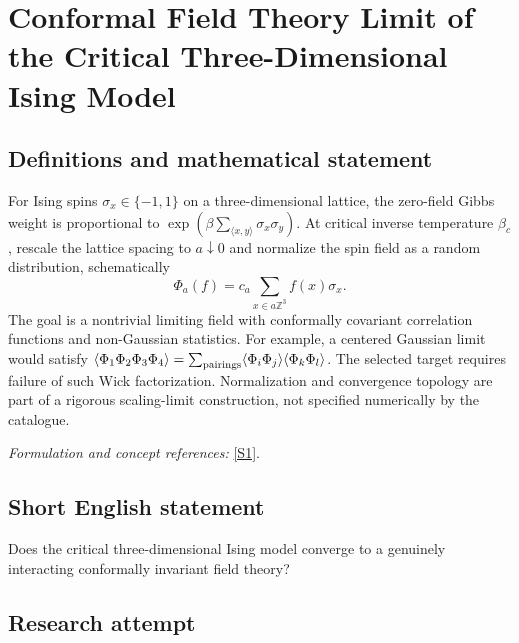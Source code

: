 \documentclass[11pt,a4paper]{article}
\newcommand{\Z}{\mathbb{Z}}
\newcommand{\sref}[2]{\hyperlink{source:#1:#2}{[S#2]}}
\newif\ifshowcatalogue
\newcommand{\cataloguescope}[1]{\ifshowcatalogue
 \paragraph{Exact scope in the supplied catalogue.}
 \begin{quote}\small #1\end{quote}\fi}
\numberwithin{equation}{section}
\begin{document}
\setcounter{section}{0}
\clearpage
\section*{\texorpdfstring{Conformal Field Theory Limit of the Critical Three-Dimensional Ising Model}{Conformal Field Theory Limit of the Critical Three-Dimensional Ising Model}}\label{30006692}
\subsection{Definitions and mathematical statement}
For Ising spins $\sigma_x\in\{-1,1\}$ on a three-dimensional lattice, the zero-field Gibbs weight is proportional to $\exp(\beta\sum_{\langle x,y\rangle}\sigma_x\sigma_y)$. At critical inverse temperature $\beta_c$, rescale the lattice spacing to $a\downarrow0$ and normalize the spin field as a random distribution, schematically
\[
 \Phi_a(f)=c_a\sum_{x\in a\Z^3}f(x)\sigma_x.
\]
The goal is a nontrivial limiting field with conformally covariant correlation functions and non-Gaussian statistics. For example, a centered Gaussian limit would satisfy $\langle\Phi_1\Phi_2\Phi_3\Phi_4\rangle=\sum_{\rm pairings}\langle\Phi_i\Phi_j\rangle\langle\Phi_k\Phi_l\rangle$. The selected target requires failure of such Wick factorization. Normalization and convergence topology are part of a rigorous scaling-limit construction, not specified numerically by the catalogue.
\par\smallskip\textit{Formulation and concept references:} \sref{30006692}{1}.
\cataloguescope{Prove that the scaling limit of the critical three-dimensional Ising model exists and is conformally invariant, with a non-Gaussian spin field whose limiting spin correlations do not factorize according to Wick's rule.}
\subsection{Short English statement}
Does the critical three-dimensional Ising model converge to a genuinely interacting conformally invariant field theory?
\subsection{Research attempt}
\end{document}

